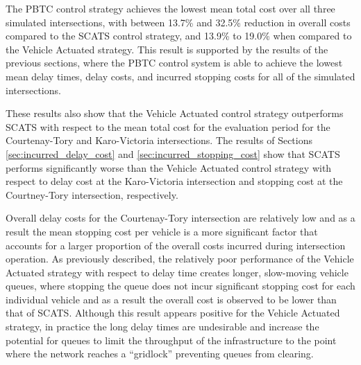 The PBTC control strategy achieves the lowest mean total cost over all three simulated intersections, with between 13.7\% and 32.5\% reduction in overall costs compared to the SCATS control strategy, and 13.9\% to 19.0\% when compared to the Vehicle Actuated strategy. This result is supported by the results of the previous sections, where the PBTC control system is able to achieve the lowest mean delay times, delay costs, and incurred stopping costs for all of the simulated intersections. 

These results also show that the Vehicle Actuated control strategy outperforms SCATS with respect to the mean total cost for the evaluation period for the Courtenay-Tory and Karo-Victoria intersections. The results of Sections \ref{sec:incurred_delay_cost} and \ref{sec:incurred_stopping_cost} show that SCATS performs significantly worse than the Vehicle Actuated control strategy with respect to delay cost at the Karo-Victoria intersection and stopping cost at the Courtney-Tory intersection, respectively.

Overall delay costs for the Courtenay-Tory intersection are relatively low and as a result  the mean stopping cost per vehicle is a more significant factor that accounts for a larger proportion of the overall costs incurred during intersection operation. As previously described, the relatively poor performance of the Vehicle Actuated strategy with respect to delay time creates longer, slow-moving vehicle queues, where stopping the queue does not incur significant stopping cost for each individual vehicle and as a result the overall cost is observed to be lower than that of SCATS. Although this result appears positive for the Vehicle Actuated strategy, in practice the long delay times are undesirable and increase the potential for queues to limit the throughput of the infrastructure to the point where the network reaches a ``gridlock'' preventing queues from clearing. 

